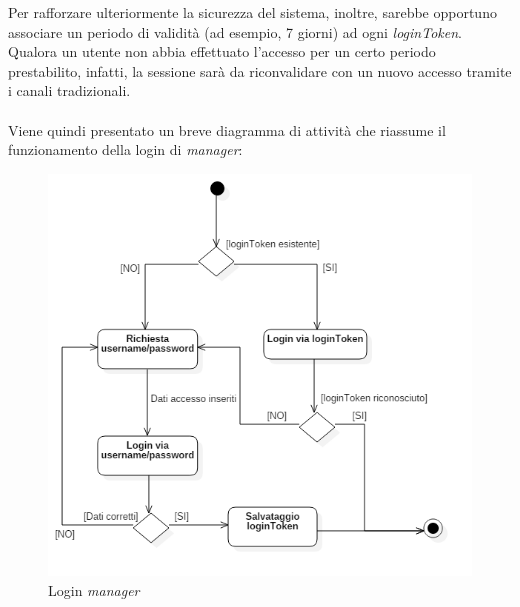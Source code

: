 \documentclass[12pt]{article}
\begin{document}
Per rafforzare ulteriormente la sicurezza del sistema, inoltre, sarebbe opportuno associare un periodo di validità (ad esempio, 7 giorni) ad ogni \textit{loginToken}.\\
Qualora un utente non abbia effettuato l'accesso per un certo periodo prestabilito, infatti, la sessione sarà da riconvalidare con un nuovo accesso tramite i canali tradizionali.\\\\
Viene quindi presentato un breve diagramma di attività che riassume il funzionamento della login di \textit{manager}:
\begin{figure}[h!]
\centering
  \includegraphics[scale=0.6]{img/activity_manager.png}
  \caption{Login \textit{manager}}
\end{figure}
\end{document}
